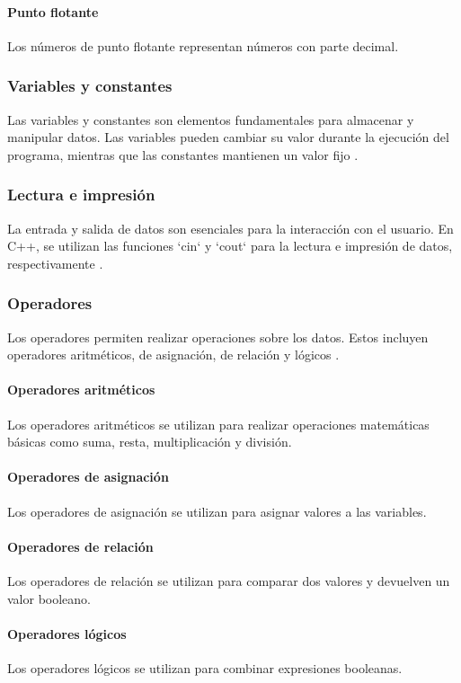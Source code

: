 \paragraph{Punto flotante}
Los números de punto flotante representan números con parte decimal.

\subsubsection{Variables y constantes}
Las variables y constantes son elementos fundamentales para almacenar y manipular datos. Las variables pueden cambiar su valor durante la ejecución del programa, mientras que las constantes mantienen un valor fijo \cite{stroustrup2013c++}.

\subsubsection{Lectura e impresión}
La entrada y salida de datos son esenciales para la interacción con el usuario. En C++, se utilizan las funciones `cin` y `cout` para la lectura e impresión de datos, respectivamente \cite{gaddis2018starting}.

\subsubsection{Operadores}
Los operadores permiten realizar operaciones sobre los datos. Estos incluyen operadores aritméticos, de asignación, de relación y lógicos \cite{stroustrup2013c++}.
\paragraph{Operadores aritméticos}
Los operadores aritméticos se utilizan para realizar operaciones matemáticas básicas como suma, resta, multiplicación y división.
\paragraph{Operadores de asignación}
Los operadores de asignación se utilizan para asignar valores a las variables.
\paragraph{Operadores de relación}
Los operadores de relación se utilizan para comparar dos valores y devuelven un valor booleano.
\paragraph{Operadores lógicos}
Los operadores lógicos se utilizan para combinar expresiones booleanas.

